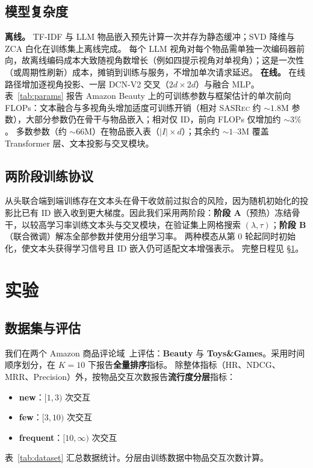 \documentclass[sigconf,natbib=true,anonymous]{acmart}
\newcommand{\base}{\textsc{SASRec}\xspace}
\newcommand{\tfidf}{\textsc{TF-IDF}\xspace}
\newcommand{\llm}{\textsc{LLM}\xspace}
\begin{document}
\subsection{模型复杂度}\label{sec:complexity}
\textbf{离线。} \tfidf 与 \llm 物品嵌入预先计算一次并存为静态缓冲；SVD 降维与 ZCA 白化在训练集上离线完成。
每个 \llm 视角对每个物品需单独一次编码器前向，故离线编码成本大致随视角数增长（例如四提示视角对单视角）；这是一次性（或周期性刷新）成本，摊销到训练与服务，不增加单次请求延迟。
\textbf{在线。} 在线路径增加逐视角投影、一层 DCN-V2 交叉（$2d{\times}2d$）与融合 MLP。
表~\ref{tab:params} 报告 Amazon Beauty 上的可训练参数与框架估计的单次前向 FLOPs：文本融合与多视角头增加适度可训练开销（相对 \base 约 ${\sim}1.8$M 参数），大部分参数仍在骨干与物品嵌入；相对仅 ID，前向 FLOPs 仅增加约 ${\sim}3\%$。
多数参数（约 ${\sim}66$M）在物品嵌入表（$|I|{\times}d$）；其余约 ${\sim}1$--$3$M 覆盖 Transformer 层、文本投影与交叉模块。

\subsection{两阶段训练协议}
从头联合端到端训练存在文本头在骨干收敛前过拟合的风险，因为随机初始化的投影比已有 ID 嵌入收到更大梯度。因此我们采用两阶段：\textbf{阶段 A}（预热）冻结骨干，以较高学习率训练文本头与交叉模块，在验证集上网格搜索 $(\lambda,\tau)$；\textbf{阶段 B}（联合微调）解冻全部参数并使用分组学习率。
两种模态从第 0 轮起同时初始化，使文本头获得学习信号且 ID 嵌入仍可适配文本增强表示。
完整日程见 \S\ref{sec:experiments}。

\section{实验}\label{sec:experiments}
\subsection{数据集与评估}
我们在两个 Amazon 商品评论域~\cite{mcauley2015amazon,ni2019amazon}上评估：\textbf{Beauty} 与 \textbf{Toys\&Games}。采用时间顺序划分，在 $K{=}10$ 下报告\textbf{全量排序}指标。
除整体指标（HR、NDCG、MRR、Precision）外，按物品交互次数报告\textbf{流行度分层}指标：
\begin{itemize}[leftmargin=*,itemsep=1pt]
  \item \textbf{new}：$[1,3)$ 次交互
  \item \textbf{few}：$[3,10)$ 次交互
  \item \textbf{frequent}：$[10,\infty)$ 次交互
\end{itemize}
表~\ref{tab:dataset} 汇总数据统计。分层由训练数据中物品交互次数计算。
\end{document}
